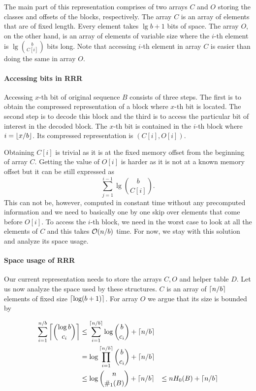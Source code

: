 The main part of this representation comprises of two arrays $C$ and $O$ storing the classes and offsets of
the blocks, respectively. The array $C$ is an array of elements that are of fixed length. Every element takes
$\lg b+1$ bits of space. The array $O$, on the other hand, is an array of elements of variable
size where the $i$-th element is $\lg {b\choose C[i]}$ bits long. Note that accessing $i$-th element
in array $C$ is easier than doing the same in array $O$.

\paragraph{Accessing bits in RRR}

Accessing $x$-th bit of original sequence $B$ consists of three steps. The first is to obtain the
compressed representation of a block where $x$-th bit is located. The second step is to decode this block and
the third is to access the particular bit of interest in the decoded block. The $x$-th bit is contained in the
$i$-th block where $i=\left\lfloor x/b \right\rfloor$. Its compressed representation is $(C[i], O[i])$.

Obtaining $C[i]$ is trivial as it is at the fixed memory offset from the beginning of array $C$. Getting the
value of $O[i]$ is harder as it is not at a known memory offset but it can be still expressed as
$$\sum_{j=1}^{i-1} \lg {b\choose C[i]}.$$ This can not be, however, computed in constant time without
any precomputed information and we need to basically one by one skip over elements that come before $O[i]$.
To access the $i$-th block, we need in the worst case to look at all the elements of $C$ and this
takes $\mathcal{O}(n/b)$ time. For now, we stay with this solution and analyze its space usage.

\paragraph{Space usage of RRR}

Our current representation needs to store the arrays $C, O$ and helper table $D$. Let us now
analyze the space used by these structures. $C$ is an array of $\left\lceil n/b \right\rceil$ elements of fixed size
$\left\lceil \log(b+1) \right\rceil$. For array $O$ we argue that its size is bounded by

\begin{align*}
    \sum_{i=1}^{n/b} \left\lceil {\log b\choose c_i} \right\rceil
    &\leq \sum_{i=1}^{\left\lceil n/b \right\rceil} \log {b\choose c_i} + \left\lceil n/b \right\rceil \\
    &= \log\prod_{i=1}^{\left\lceil n/b \right\rceil} {b\choose c_i} + \left\lceil n/b \right\rceil \\
    &\leq \log{n\choose \#_1(B)} + \left\lceil n/b \right\rceil &\leq nH_0(B) + \left\lceil n/b \right\rceil
\end{align*}

